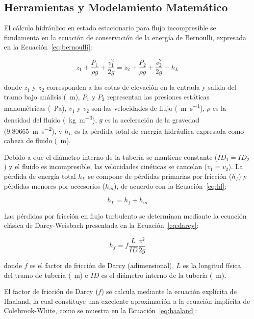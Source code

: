 \subsection{Herramientas y Modelamiento Matemático}
\label{ssec:herramientas}

El cálculo hidráulico en estado estacionario para flujo incompresible se fundamenta en la ecuación de conservación de la energía de Bernoulli, expresada en la Ecuación~\ref{eq:bernoulli}:

\begin{equation}
    z_1 + \frac{P_1}{\rho g} + \frac{v_1^2}{2g} = z_2 + \frac{P_2}{\rho g} + \frac{v_2^2}{2g} + h_L
    \label{eq:bernoulli}
\end{equation}

\noindent donde $z_1$ y $z_2$ corresponden a las cotas de elevación en la entrada y salida del tramo bajo análisis (\SI{}{\meter}), $P_1$ y $P_2$ representan las presiones estáticas manométricas (\SI{}{\pascal}), $v_1$ y $v_2$ son las velocidades de flujo (\SI{}{\meter\per\second}), $\rho$ es la densidad del fluido (\SI{}{\kilogram\per\cubic\meter}), $g$ es la aceleración de la gravedad (\SI{9.80665}{\meter\per\second\squared}), y $h_L$ es la pérdida total de energía hidráulica expresada como cabeza de fluido (\SI{}{\meter}).

Debido a que el diámetro interno de la tubería se mantiene constante ($ID_1 = ID_2$) y el fluido es incompresible, las velocidades cinéticas se cancelan ($v_1 = v_2$). La pérdida de energía total $h_L$ se compone de pérdidas primarias por fricción ($h_f$) y pérdidas menores por accesorios ($h_m$), de acuerdo con la Ecuación~\ref{eq:hl}:

\begin{equation}
    h_L = h_f + h_m
    \label{eq:hl}
\end{equation}

Las pérdidas por fricción en flujo turbulento se determinan mediante la ecuación clásica de Darcy-Weisbach presentada en la Ecuación~\ref{eq:darcy}:

\begin{equation}
    h_f = f \frac{L}{ID} \frac{v^2}{2g}
    \label{eq:darcy}
\end{equation}

\noindent donde $f$ es el factor de fricción de Darcy (adimensional), $L$ es la longitud física del tramo de tubería (\SI{}{\meter}) e $ID$ es el diámetro interno de la tubería (\SI{}{\meter}).

El factor de fricción de Darcy ($f$) se calcula mediante la ecuación explícita de Haaland, la cual constituye una excelente aproximación a la ecuación implícita de Colebrook-White, como se muestra en la Ecuación~\ref{eq:haaland}:

